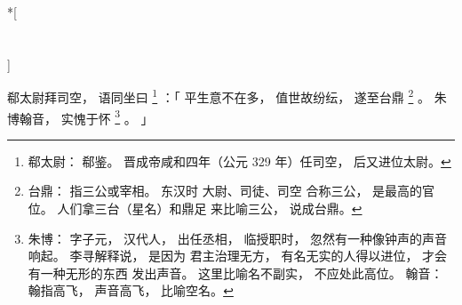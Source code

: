 
\switchcolumn[0]*[\section{}]

郗太尉拜司空，
语同坐曰%
\footnote{%
    郗太尉：
        郗鉴。
        晋成帝咸和四年（公元 329 年）任司空，
        后又进位太尉。
}%
：「
    平生意不在多，
    值世故纷纭，
    遂至台鼎%
    \footnote{%
        台鼎：
            指三公或宰相。
            东汉时
            大尉、司徒、司空
            合称三公，
            是最高的官位。
            人们拿三台（星名）和鼎足
            来比喻三公，
            说成台鼎。
    }%
    。
    朱博翰音，
    实愧于怀%
    \footnote{%
        朱博：
            字子元，
            汉代人，
            出任丞相，
            临授职时，
            忽然有一种像钟声的声音响起。
            李寻解释说，
            是因为
            君主治理无方，
            有名无实的人得以进位，
            才会有一种无形的东西
            发出声音。
            这里比喻名不副实，
            不应处此高位。
        翰音：
            翰指高飞，
            声音高飞，
            比喻空名。
    }%
    。
」

\switchcolumn


